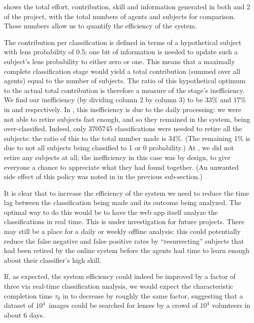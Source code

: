 \documentclass[useAMS,usenatbib,a4paper]{mn2e}
\begin{document}
 shows the total effort, contribution, skill and
information generated in both \StageOne and 2 of the \cfhtls project, with the
total numbers of agents and subjects for comparison.   These numbers allow us
to quantify the efficiency of the system.

The contribution per classification is defined in terms of a hypothetical
subject with lens probability of 0.5; one bit of information is needed to
update such a subject's lens probability to either zero or one. This means
that a maximally complete classification stage would yield a total
contribution (summed over all agents) equal to the number of subjects. The
ratio of this hypothetical optimum to the actual total contribution is
therefore a measure of the stage's inefficiency. We find our inefficiency (by
dividing column 2 by column 3) to be 33\% and 17\% in \StageOne and \StageTwo
respectively. In \StageOne, this inefficiency is due to the daily processing: we
were not able to retire subjects fast enough, and so they remained in the
system, being over-classified. Indeed, only 3705745 classifications were
needed to retire all the subjects: the ratio of this to the total number made
is 34\%. (The remaining 1\% is due to not all subjects being classified to 1
or 0 probability.) At \StageTwo, we did not retire any subjects at all; the
inefficiency in this case was by design, to give everyone a chance to
appreciate what they had found together. (An unwanted side effect of this
policy was noted in  in the
previous sub-section.)

It is clear that to increase the efficiency of the system we need to reduce the
time lag between the classification being made and its outcome being analyzed.
The optimal way to do this would be to have the web app itself analyze the
classifications in real time. This is under investigation for future projects.
There may still be a place for a daily or weekly offline analysis: this could
potentially reduce the false negative and false positive rates by
``resurrecting'' subjects that had been retired by the online system before the
agents had time to learn enough about their classifier's high skill.

If, as expected, the system efficiency could indeed be improved by a factor of
three via real-time classification analysis, we would expect the characteristic
completion time $\tau_0$  in  to decrease by roughly the same
factor, suggesting that a dataset of $10^4$~images could be searched for lenses
by a crowd of $10^4$ volunteers in about 6 days.
\end{document}
